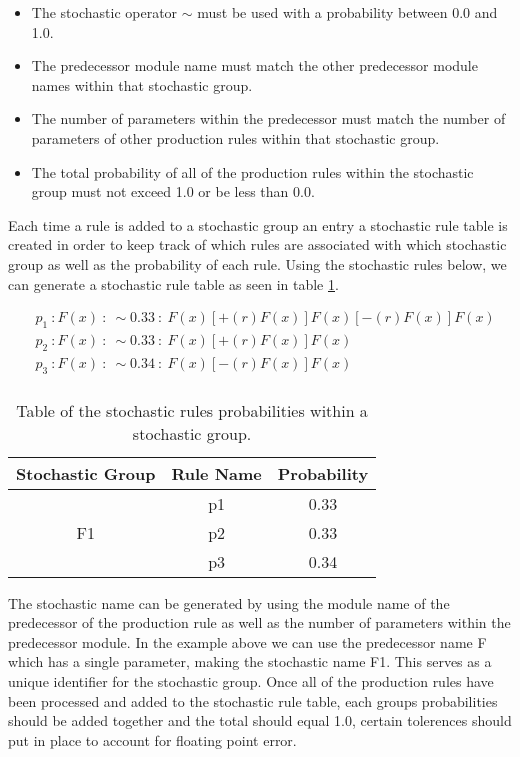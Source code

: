 \begin{itemize}
\item The stochastic operator $\sim$ must be used with a probability between 0.0 and 1.0.
\item The predecessor module name must match the other predecessor module names within that stochastic group.
\item The number of parameters within the predecessor must match the number of parameters of other production rules within that stochastic group.
\item The total probability of all of the production rules within the stochastic group must not exceed 1.0 or be less than 0.0.
\end{itemize}

Each time a rule is added to a stochastic group an entry a stochastic rule table is created in order to keep track of which rules are associated with which stochastic group as well as the probability of each rule. Using the stochastic rules below, we can generate a stochastic rule table as seen in table \ref{stochastic table}. 

\begin{equation} \label{stochastic implementation example}
\begin{aligned}
	&p_1~ :  F(x)~ :~ \sim 0.33 ~ :~ F(x)[+(r)F(x)]F(x)[-(r)F(x)]F(x)\\
	&p_2~ :  F(x)~ :~ \sim 0.33 ~ :~ F(x)[+(r)F(x)]F(x)\\
	&p_3~ :  F(x)~ :~ \sim 0.34 ~ :~ F(x)[-(r)F(x)]F(x)\\
\end{aligned}
\end{equation}

\begin{table}[h!] \center
\begin{tabular}{ | c | c | c | }
\hline
	Stochastic Group & Rule Name & Probability\\  
\hline
\hline
\multirow{3}{*}{F1} & p1 & 0.33 \\
& p2 & 0.33 \\
& p3 & 0.34 \\
\hline
\end{tabular}
\caption{Table of the stochastic rules probabilities within a stochastic group.}
\label{stochastic table}
\end{table}
\FloatBarrier

The stochastic name can be generated by using the module name of the predecessor of the production rule as well as the number of parameters within the predecessor module. In the example above we can use the predecessor name F which has a single parameter, making the stochastic name F1. This serves as a unique identifier for the stochastic group. Once all of the production rules have been processed and added to the stochastic rule table, each groups probabilities should be added together and the total should equal 1.0, certain tolerences should put in place to account for floating point error. 

